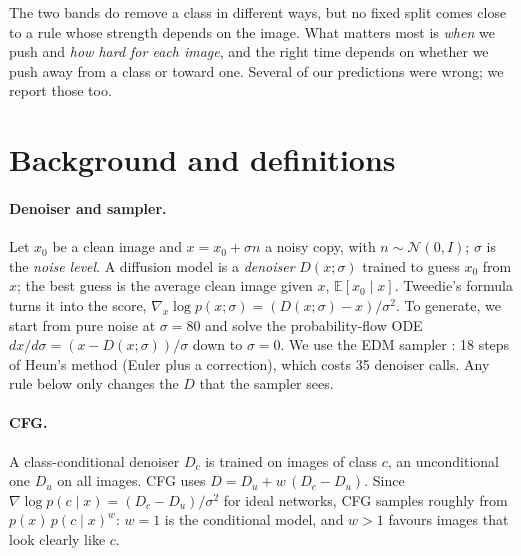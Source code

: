 \documentclass[11pt]{article}
\begin{document}
The two bands do remove a class in different ways, but no fixed split comes close to a rule whose strength depends
on the image. What matters most is \emph{when} we push and \emph{how hard for each image}, and the right time depends
on whether we push away from a class or toward one. Several of our predictions were wrong; we report those too.

\section{Background and definitions}
\label{sec:background}

\paragraph{Denoiser and sampler.} Let $x_0$ be a clean image and $x = x_0 + \sigma n$ a noisy copy, with
$n \sim \mathcal{N}(0, I)$; $\sigma$ is the \emph{noise level}. A diffusion model is a \emph{denoiser} $D(x;\sigma)$
trained to guess $x_0$ from $x$; the best guess is the average clean image given $x$, $\mathbb{E}[x_0 \mid x]$.
Tweedie's formula turns it into the score, $\nabla_x \log p(x;\sigma) = (D(x;\sigma) - x)/\sigma^2$. To generate,
we start from pure noise at $\sigma = 80$ and solve the probability-flow ODE $dx/d\sigma = (x - D(x;\sigma))/\sigma$
down to $\sigma = 0$. We use the EDM sampler \cite{edm}: 18 steps of Heun's method (Euler plus a correction), which
costs 35 denoiser calls. Any rule below only changes the $D$ that the sampler sees.

\paragraph{CFG.} A class-conditional denoiser $D_c$ is trained on images of class $c$, an unconditional one $D_u$ on
all images. CFG \cite{cfg} uses $D = D_u + w\,(D_c - D_u)$. Since
$\nabla \log p(c \mid x) = (D_c - D_u)/\sigma^2$ for ideal networks, CFG samples roughly from
$p(x)\,p(c\mid x)^w$: $w = 1$ is the conditional model, and $w > 1$ favours images that look clearly like $c$.
\end{document}
